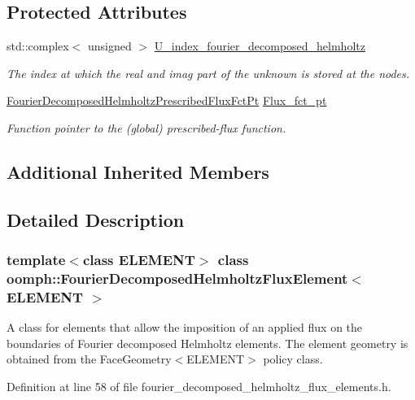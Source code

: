 \subsection*{Protected Attributes}
\begin{DoxyCompactItemize}
\item 
std\+::complex$<$ unsigned $>$ \hyperlink{classoomph_1_1FourierDecomposedHelmholtzFluxElement_ad4145847e04e141392e48b217ddb9125}{U\+\_\+index\+\_\+fourier\+\_\+decomposed\+\_\+helmholtz}
\begin{DoxyCompactList}\small\item\em The index at which the real and imag part of the unknown is stored at the nodes. \end{DoxyCompactList}\item 
\hyperlink{classoomph_1_1FourierDecomposedHelmholtzFluxElement_af230a2a3a16a1fd0a48a2681dc94c1e8}{Fourier\+Decomposed\+Helmholtz\+Prescribed\+Flux\+Fct\+Pt} \hyperlink{classoomph_1_1FourierDecomposedHelmholtzFluxElement_afff67548b1df4ca2add4d8397ffd9493}{Flux\+\_\+fct\+\_\+pt}
\begin{DoxyCompactList}\small\item\em Function pointer to the (global) prescribed-\/flux function. \end{DoxyCompactList}\end{DoxyCompactItemize}
\subsection*{Additional Inherited Members}


\subsection{Detailed Description}
\subsubsection*{template$<$class E\+L\+E\+M\+E\+NT$>$\newline
class oomph\+::\+Fourier\+Decomposed\+Helmholtz\+Flux\+Element$<$ E\+L\+E\+M\+E\+N\+T $>$}

A class for elements that allow the imposition of an applied flux on the boundaries of Fourier decomposed Helmholtz elements. The element geometry is obtained from the Face\+Geometry$<$\+E\+L\+E\+M\+E\+N\+T$>$ policy class. 

Definition at line 58 of file fourier\+\_\+decomposed\+\_\+helmholtz\+\_\+flux\+\_\+elements.\+h.



